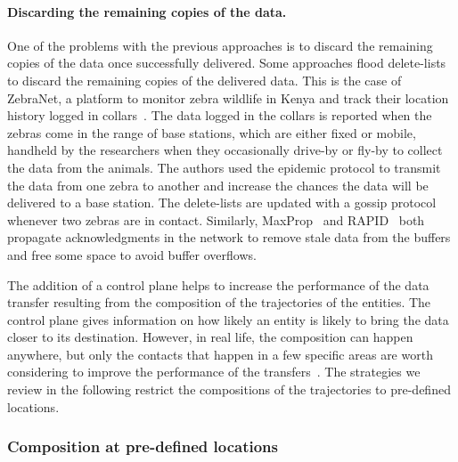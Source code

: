 \paragraph{Discarding the remaining copies of the data.}
One of the problems with the previous approaches is to discard the remaining copies of the data once successfully delivered. Some approaches flood delete-lists to discard the remaining copies of the delivered data. This is the case of ZebraNet, a platform to monitor zebra wildlife in Kenya and track their location history logged in collars~\cite{juang2002energy}. The data logged in the collars is reported when the zebras come in the range of base stations, which are either fixed or mobile, handheld by the researchers when they occasionally drive-by or fly-by to collect the data from the animals. The authors used the epidemic protocol to transmit the data from one zebra to another and increase the chances the data will be delivered to a base station. The delete-lists are updated with a gossip protocol whenever two zebras are in contact. Similarly, MaxProp~\cite{burgess2006maxprop} and RAPID~\cite{balasubramanian2010replication} both propagate acknowledgments in the network to remove stale data from the buffers and free some space to avoid buffer overflows. 

The addition of a control plane helps to increase the performance of the data transfer resulting from the composition of the trajectories of the entities. The control plane gives information on how likely an entity is likely to bring the data closer to its destination. However, in real life, the composition can happen anywhere, but only the contacts that happen in a few specific areas are worth considering to improve the performance of the transfers~\cite{kang2004extracting,sarafijanovic2006island}. The strategies we review in the following restrict the compositions of the trajectories to pre-defined locations.

\clearpage
\subsubsection{Composition at pre-defined locations}
\label{sec:indirect-sync-anchored}

